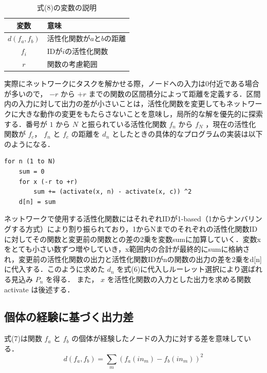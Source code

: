 \begin{table}[h]
    \caption{式(8)の変数の説明}
    \centering
    \begin{tabular}{cl}
        \hline
        変数  & 意味 \\
        \hline \hline
        $d(f_{a}, f_{b})$ & 活性化関数が$a$と$b$の距離                 \\
        $f_{i}$           & IDが$i$の活性化関数                        \\
        $r$               & 関数の考慮範囲                             \\
        \hline
    \end{tabular}
\end{table}

実際にネットワークにタスクを解かせる際，ノードへの入力は0付近である場合が多いので\cite{ノード入力}， $ -r $ から $ +r $ までの関数の区間積分によって距離を定義する．区間内の入力に対して出力の差が小さいことは，活性化関数を変更してもネットワークに大きな動作の変更をもたらさないことを意味し，局所的な解を優先的に探索する．番号が $ 1 $ から $ N $ と振られている活性化関数 $ f_n $ から $ f_N $ ，現在の活性化関数が $ f_c $， $ f_n $ と $ f_c $ の距離を $ d_n $ としたときの具体的なプログラムの実装は以下のようになる．

\begin{lstlisting}[caption=区間積分差のプログラム]
for n (1 to N)
    sum = 0
    for x (-r to +r)
        sum += (activate(x, n) - activate(x, c)) ^2
    d[n] = sum
\end{lstlisting}

ネットワークで使用する活性化関数にはそれぞれIDが1-based（1からナンバリングする方式）により割り振られており，1からNまでのそれぞれの活性化関数IDに対してその関数と変更前の関数との差の2乗を変数sumに加算していく．変数xをとても小さい数ずつ増やしていき，x範囲内の合計が最終的にsumに格納され，変更前の活性化関数の出力と活性化関数IDがnの関数の出力の差を2乗をd[n]に代入する．このように求めた $ d_n $ を式(6)に代入しルーレット選択により選ばれる見込み $ P_n $ を得る．
また， $ x $ を活性化関数の入力とした出力を求める関数 activate は後述する．

\subsection{個体の経験に基づく出力差}
式(7)は関数 $ f_a $ と $ f_b $ の個体が経験したノードの入力に対する差を意味している．
\begin{equation}
    d(f_{a}, f_{b}) = \sum_{m}(f_{a}(in_{m}) - f_{b}(in_{m}))^2
\end{equation}

